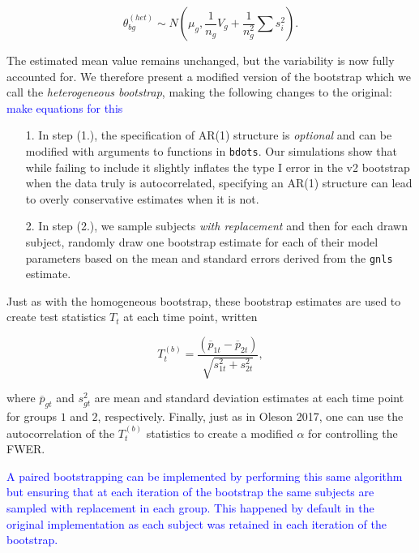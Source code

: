 \documentclass{article}
\newcommand{\xt}{\texttt}
\providecommand{\cn}[1]{\textcolor{blue}{#1}}
\begin{document}
\begin{equation}\label{eq:w_rep_boot}
\theta_{bg}^{(het)} \sim N \left( \mu_{g}, \frac{1}{n_g} V_{g} + \frac{1}{n_g^2} \sum s_i^2 \right).
\end{equation}

The estimated mean value remains unchanged, but the variability is now fully accounted for. We therefore present a modified version of the bootstrap which we call the \textit{heterogeneous bootstrap}, making the following changes to the original: \cn{make equations for this}

\begin{singlespace}
\begin{enumerate}
\vspace{-2mm}
\item[1.] In step (1.), the specification of AR(1) structure is \textit{optional} and can be modified with arguments to functions in \xt{bdots}. Our simulations show that while failing to include it slightly inflates the type I error in the v2 bootstrap when the data truly is autocorrelated, specifying an AR(1) structure can lead to overly conservative estimates when it is not.
\item[2.] In step (2.), we sample subjects \textit{with replacement} and then for each drawn subject, randomly draw one bootstrap estimate for each of their model parameters based on the mean and standard errors derived from the \xt{gnls} estimate.
\end{enumerate}
\end{singlespace}

Just as with the homogeneous bootstrap, these bootstrap estimates are used to create test statistics $T_t$ at each time point, written

\begin{equation}
T_t^{(b)} = \frac{(\overline{p}_{1t} - \overline{p}_{2t})}{\sqrt{s_{1t}^2 + s_{2t}^2}},
\end{equation}

where $\overline{p}_{gt}$ and $s_{gt}^2$ are mean and standard deviation estimates at each time point for groups $1$ and $2$, respectively. Finally, just as in Oleson 2017, one can use the autocorrelation of the $T_t^{(b)}$ statistics to create a modified $\alpha$ for controlling the FWER.



\cn{A paired bootstrapping can be implemented by performing this same algorithm but ensuring that at each iteration of the bootstrap the same subjects are sampled with replacement in each group. This happened by default in the original implementation as each subject was retained in each iteration of the bootstrap.}
\end{document}

